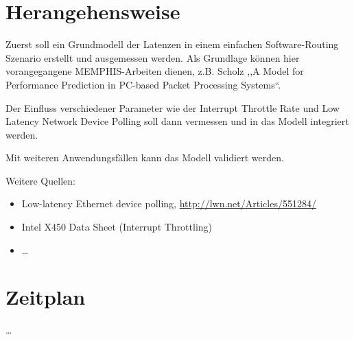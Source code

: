 \documentclass[a4paper]{article}
\begin{document}
\section*{Herangehensweise}
Zuerst soll ein Grundmodell der Latenzen in einem einfachen Software-Routing Szenario erstellt und ausgemessen werden. Als Grundlage können hier vorangegangene MEMPHIS-Arbeiten dienen, z.B. Scholz ,,A Model for Performance Prediction in PC-based Packet Processing Systems``.

Der Einfluss verschiedener Parameter wie der Interrupt Throttle Rate und Low Latency Network Device Polling soll dann vermessen und in das Modell integriert werden.

Mit weiteren Anwendungsfällen kann das Modell validiert werden.

\vspace{1em}
Weitere Quellen:
\begin{itemize}
  \item Low-latency Ethernet device polling, \url{http://lwn.net/Articles/551284/}
  \item Intel X450 Data Sheet (Interrupt Throttling)
  \item \dots
\end{itemize}


\section*{Zeitplan}

\dots
\end{document}
